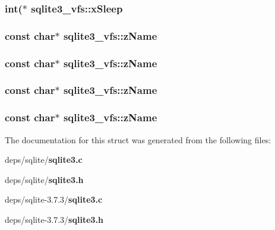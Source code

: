 \subsubsection{\setlength{\rightskip}{0pt plus 5cm}int($\ast$ \bf{sqlite3\_\-vfs::x\-Sleep}}\label{structsqlite3__vfs_6d8a77b40d0ca58260ba3e59146cc258}


\subsubsection{\setlength{\rightskip}{0pt plus 5cm}const char$\ast$ \bf{sqlite3\_\-vfs::z\-Name}}\label{structsqlite3__vfs_316ee65fab88994c5451e782d91aa308}


\subsubsection{\setlength{\rightskip}{0pt plus 5cm}const char$\ast$ \bf{sqlite3\_\-vfs::z\-Name}}\label{structsqlite3__vfs_316ee65fab88994c5451e782d91aa308}


\subsubsection{\setlength{\rightskip}{0pt plus 5cm}const char$\ast$ \bf{sqlite3\_\-vfs::z\-Name}}\label{structsqlite3__vfs_316ee65fab88994c5451e782d91aa308}


\subsubsection{\setlength{\rightskip}{0pt plus 5cm}const char$\ast$ \bf{sqlite3\_\-vfs::z\-Name}}\label{structsqlite3__vfs_316ee65fab88994c5451e782d91aa308}




The documentation for this struct was generated from the following files:\begin{CompactItemize}
\item 
deps/sqlite/\bf{sqlite3.c}\item 
deps/sqlite/\bf{sqlite3.h}\item 
deps/sqlite-3.7.3/\bf{sqlite3.c}\item 
deps/sqlite-3.7.3/\bf{sqlite3.h}\end{CompactItemize}

